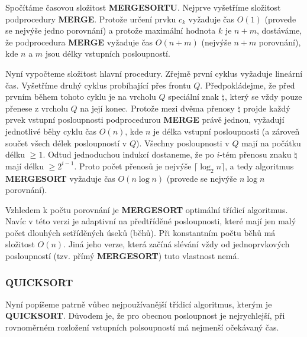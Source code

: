 \documentclass[a4paper,12pt]{article}
\begin{document}
Spočítáme časovou složitost {\bf MERGESORTU}. 
Nejprve vyšetříme slo\-ži\-tost podprocedury {\bf MER\-GE}. Protože 
určení prvku $c_k$ vyža\-du\-je čas $O(1)$ (provede se 
nejvýše jedno porovnání) a 
protože maximální hodnota $k$ je $n+m$, dostáváme, že 
podprocedura {\bf MERGE} vyžaduje čas $O(n+m)$ (nejvýše $
n+m$ 
porovnání), kde $n$ a $m$ jsou délky vstupních posloupností.

Nyní vypočteme složitost hlavní procedury. 
Zřejmě první cyklus vyžaduje lineární čas. Vyšetříme 
druhý cyklus probíhající přes frontu $Q$. Předpokládejme, že před prvním během 
tohoto cyklu je na vrcholu $Q$ speciální znak $\natural$, který se vždy 
pouze přenese z vrcholu $Q$ na její konec. Protože mezi dvěma 
přenosy $\natural$ projde každý prvek vstupní posloupnosti 
podprocedurou {\bf MERGE} právě jednou, vyžadují jednotlivé běhy cyklu 
čas $O(n)$, kde 
$n$ je délka vstupní posloupnosti (a zároveň součet všech délek 
posloupností v $Q$). Všech\-ny posloupnosti v $Q$ mají  
na počátku délku $\ge 1$. Odtud jednoduchou indukcí 
dostaneme, že po $i$-tém přenosu znaku $\natural$ mají 
délku $\ge 2^{i-1}$. Proto počet přenosů je 
nejvýše $\lceil\log_2n\rceil$, a tedy algoritmus {\bf MERGESORT }
vyžaduje čas $O(n\log n)$ (provede se nejvýše $n\log n$ 
porovnání).

Vzhledem k 
počtu porovnání je {\bf MERGESORT} optimální třídicí algoritmus. 
Navíc v této verzi je adaptivní na předtříděné 
posloupnosti, které mají jen malý počet dlouhých 
setříděných úseků (běhů). Při 
konstantním počtu běhů má složitost $O(n)$. Jiná 
jeho verze, která začíná slévání vždy od 
jednoprvkových posloupností (tzv. přímý {\bf MERGESORT}) 
tuto vlastnost nemá. 

\subsubsection{QUICKSORT}

Nyní popíšeme patrně vůbec 
nejpoužívanější třídicí algoritmus, kterým je {\bf QUICKSORT}. 
Důvodem je, že pro obecnou posloupnost je 
nejrychlejší, při rovnoměrném rozložení vstupních 
polsoupností má nejmenší očekávaný čas. 
\end{document}
